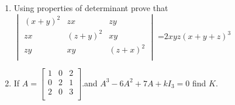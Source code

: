 \documentclass[12pt,-letter paper]{article}
\providecommand{\mydet}[1]{\ensuremath{\begin{vmatrix}#1\end{vmatrix}}}
\providecommand{\myvec}[1]{\ensuremath{\begin{bmatrix}#1\end{bmatrix}}}
\providecommand{\brak}[1]{\ensuremath{\left(#1\right)}}
\begin{document}
\begin{enumerate}
	\item Using properties of determinant prove that \\
		$\mydet{
			\brak{x+y}^{2} & zx &  zy\\
			zx & \brak{z+y}^{2} & xy\\
			zy & xy & \brak{z+x}^{2}\\
		
		}$
		=$2xyz\brak{x+y+z}^{3}$

   \item  If $A=\myvec{
		   1 & 0 & 2 \\
		   0  & 2 & 1 \\
		   2 & 0 & 3 \\

	}$.and $A^3-6A^2+7A+kI_3=0$  find $K$.


   
\end{enumerate}
\end{document}
